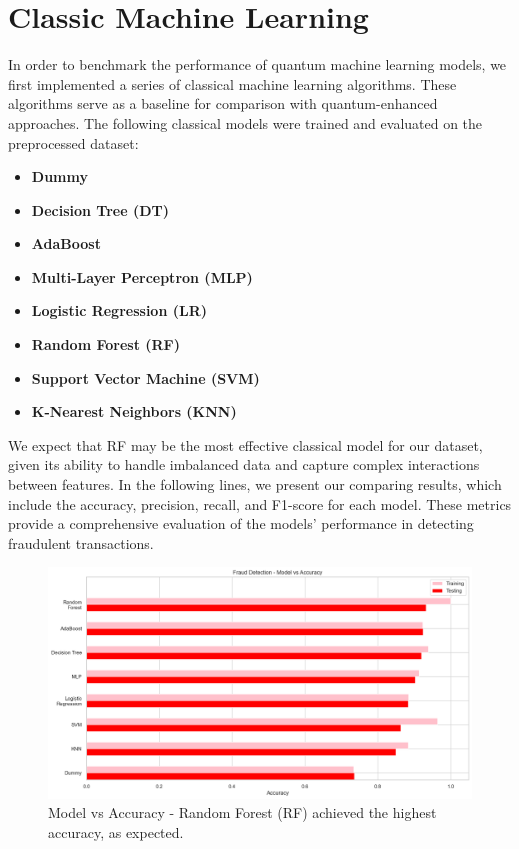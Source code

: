 \documentclass[10pt]{article}
\begin{document}
\section{Classic Machine Learning}
In order to benchmark the performance of quantum machine learning models, we first implemented a series of classical machine learning algorithms. These algorithms serve as a baseline for comparison with quantum-enhanced approaches. The following classical models were trained and evaluated on the preprocessed dataset:
\begin{itemize}
	\item \textbf{Dummy}
	\item \textbf{Decision Tree (DT)}
	\item \textbf{AdaBoost}
	\item \textbf{Multi-Layer Perceptron (MLP)}
	\item \textbf{Logistic Regression (LR)}
	\item \textbf{Random Forest (RF)}
	\item \textbf{Support Vector Machine (SVM)}
	\item \textbf{K-Nearest Neighbors (KNN)}
\end{itemize}
We expect that RF may be the most effective classical model for our dataset, given its ability to handle imbalanced data and capture complex interactions between features. In the following lines, we present our comparing results, which include the accuracy, precision, recall, and F1-score for each model. These metrics provide a comprehensive evaluation of the models' performance in detecting fraudulent transactions.
\begin{figure}[H]
	\centering
	\includegraphics[height = 0.37\textheight]{img/fraud_detection_model_accuracy.png}
	\caption{Model vs Accuracy - Random Forest (RF) achieved the highest accuracy, as expected.}
\end{figure}
\end{document}
